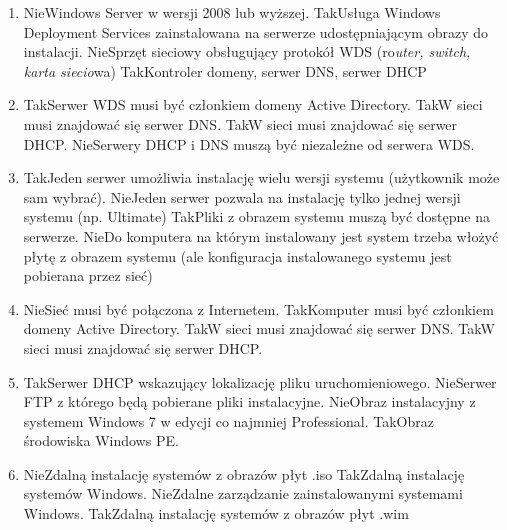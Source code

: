 \begin{enumerate}
		\newpage
		\item {}%
		{Nie}{Windows Server w wersji 2008 lub wyższej.}%
		{Tak}{Usługa Windows Deployment Services zainstalowana na serwerze udostępniającym obrazy do instalacji.}%
		{Nie}{Sprzęt sieciowy obsługujący protokół WDS (ro\textsl{uter, switch, karta siecio}wa)}%
		{Tak}{Kontroler domeny, serwer DNS, serwer DHCP}
		\item {}%
		{Tak}{Serwer WDS musi być członkiem domeny Active Directory.}%
		{Tak}{W sieci musi znajdować się serwer DNS.}%
		{Tak}{W sieci musi znajdować się serwer DHCP.}%
		{Nie}{Serwery DHCP i DNS muszą być niezależne od serwera WDS.}
		\item {}%
		{Tak}{Jeden serwer umożliwia instalację wielu wersji systemu (użytkownik może sam wybrać).}%
		{Nie}{Jeden serwer pozwala na instalację tylko jednej wersji systemu (np. Ultimate)}%
		{Tak}{Pliki z obrazem systemu muszą być dostępne na serwerze.}%
		{Nie}{Do komputera na którym instalowany jest system trzeba włożyć płytę z obrazem systemu (ale konfiguracja instalowanego systemu jest pobierana przez sieć)}
		\item {}%
		{Nie}{Sieć musi być połączona z Internetem.}%
		{Tak}{Komputer musi być członkiem domeny Active Directory.}%
		{Tak}{W sieci musi znajdować się serwer DNS.}%
		{Tak}{W sieci musi znajdować się serwer DHCP.}
		\item {}%
		{Tak}{Serwer DHCP wskazujący lokalizację pliku uruchomieniowego.}%
		{Nie}{Serwer FTP z którego będą pobierane pliki instalacyjne.}%
		{Nie}{Obraz instalacyjny z systemem Windows 7 w edycji co najmniej Professional.}%
		{Tak}{Obraz środowiska Windows PE.}
		\item {}%
		{Nie}{Zdalną instalację systemów z obrazów płyt .iso}%
		{Tak}{Zdalną instalację systemów Windows.}%
		{Nie}{Zdalne zarządzanie zainstalowanymi systemami Windows.}%
		{Tak}{Zdalną instalację systemów z obrazów płyt .wim}
		

\end{enumerate}
